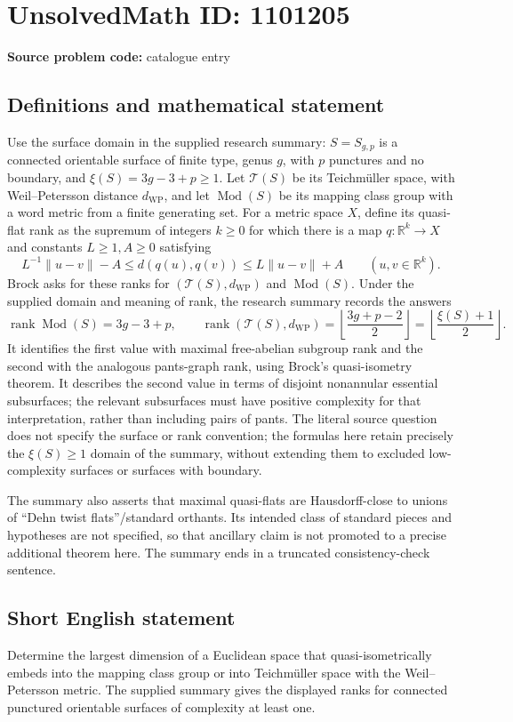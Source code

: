 \documentclass[11pt]{article}
\newcommand{\R}{\mathbb{R}}
\begin{document}
\section*{UnsolvedMath ID: 1101205}
\textbf{Source problem code:} catalogue entry
\subsection{Definitions and mathematical statement}
Use the surface domain in the supplied research summary: \(S=S_{g,p}\) is a connected orientable surface of finite type, genus \(g\), with \(p\) punctures and no boundary, and \(\xi(S)=3g-3+p\ge1\). Let \(\mathcal T(S)\) be its Teichm\"uller space, with Weil--Petersson distance \(d_{\mathrm{WP}}\), and let \(\operatorname{Mod}(S)\) be its mapping class group with a word metric from a finite generating set. For a metric space \(X\), define its quasi-flat rank as the supremum of integers \(k\ge0\) for which there is a map \(q:\R^k\to X\) and constants \(L\ge1,A\ge0\) satisfying
\[
L^{-1}\|u-v\|-A\le d(q(u),q(v))\le L\|u-v\|+A\qquad(u,v\in\R^k).
\]
Brock asks for these ranks for \((\mathcal T(S),d_{\mathrm{WP}})\) and \(\operatorname{Mod}(S)\). Under the supplied domain and meaning of rank, the research summary records the answers
\[
\operatorname{rank}\operatorname{Mod}(S)=3g-3+p,
\qquad
\operatorname{rank}(\mathcal T(S),d_{\mathrm{WP}})
=\left\lfloor\frac{3g+p-2}{2}\right\rfloor
=\left\lfloor\frac{\xi(S)+1}{2}\right\rfloor.
\]
It identifies the first value with maximal free-abelian subgroup rank and the second with the analogous pants-graph rank, using Brock's quasi-isometry theorem. It describes the second value in terms of disjoint nonannular essential subsurfaces; the relevant subsurfaces must have positive complexity for that interpretation, rather than including pairs of pants. The literal source question does not specify the surface or rank convention; the formulas here retain precisely the \(\xi(S)\ge1\) domain of the summary, without extending them to excluded low-complexity surfaces or surfaces with boundary.

The summary also asserts that maximal quasi-flats are Hausdorff-close to unions of ``Dehn twist flats''/standard orthants. Its intended class of standard pieces and hypotheses are not specified, so that ancillary claim is not promoted to a precise additional theorem here. The summary ends in a truncated consistency-check sentence.
\subsection{Short English statement}
Determine the largest dimension of a Euclidean space that quasi-isometrically embeds into the mapping class group or into Teichm\"uller space with the Weil--Petersson metric. The supplied summary gives the displayed ranks for connected punctured orientable surfaces of complexity at least one.
\end{document}
